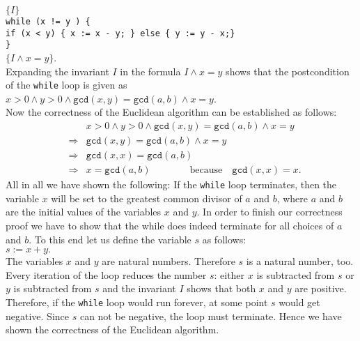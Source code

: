 \noindent
\hspace*{1.3cm} 
$\{ I \}$
\\[0.1cm]
\hspace*{2.2cm}
\texttt{while (x != y ) \{} \\[0.1cm]
\hspace*{3.2cm}
         \texttt{if (x < y) \{ x := x - y; \} else \{ y := y - x;\}}
\\[0.1cm]
\hspace*{2.2cm}
\texttt{\}} \quad 
\\[0.1cm]
\hspace*{1.3cm}
$\{ I \wedge x = y \}$. 
\\[0.2cm]
Expanding the invariant $I$ in the formula $I \wedge x = y$ shows that the postcondition of the 
\texttt{while} loop is given as
\\[0.2cm]
\hspace*{1.3cm}
$x > 0 \wedge y > 0 \wedge \texttt{gcd}(x,y) = \texttt{gcd}(a,b) \wedge x = y$.
\\[0.2cm]
Now the correctness of the Euclidean algorithm can be established as follows:
\begin{eqnarray*}
&             &  x > 0 \wedge y > 0 \wedge \texttt{gcd}(x,y) = \texttt{gcd}(a,b) \wedge x = y \\
& \Rightarrow & \texttt{gcd}(x,y) = \texttt{gcd}(a,b) \wedge x = y \\
& \Rightarrow & \texttt{gcd}(x,x) = \texttt{gcd}(a,b)  \\
& \Rightarrow & x = \texttt{gcd}(a,b) \qquad\qquad \mathrm{because} \quad \texttt{gcd}(x,x) = x.
\end{eqnarray*}
All in all we have shown the following: If the \texttt{while} loop terminates, then
the variable $x$ will be set to the greatest common divisor of $a$ and $b$, where $a$ and $b$ are
the initial values of the variables $x$ and $y$.  In order to finish our correctness proof we have
to show that the while does indeed terminate for all choices of $a$ and $b$.
To this end let us define the variable $s$ as follows:
\\[0.2cm]
\hspace*{1.3cm}
$ s := x + y. $
\\[0.2cm]
The variables $x$ and $y$ are natural numbers.  Therefore $s$ is a natural number, too.
Every iteration of the loop reduces the number $s$: either $x$ is subtracted from $s$
or $y$ is subtracted from  $s$ and the invariant $I$ shows that both $x$ and $y$ are
positive.  Therefore, if the \texttt{while} loop would run forever, at some point $s$ would get
negative.  Since $s$ can not be negative, the loop must terminate.
Hence we have shown the correctness of the Euclidean  algorithm.
\pagebreak

